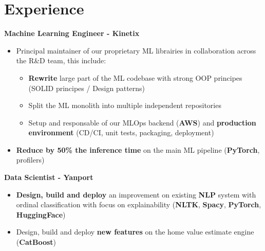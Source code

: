 \documentclass[a4paper,10pt]{article}
\begin{document}
\begin{adjustbox}{valign=t}
    \begin{minipage}{0.6\textwidth}
        \section*{Experience}
        \vspace{-.3cm}
        \begin{description}
            \raggedright
            \item[\normalfont \textcolor{ColorOne}{Since Oct. 2022}]
                \textbf{Machine Learning Engineer - Kinetix}\\
                \small
                \begin{itemize}[topsep=0pt]
                    \item Principal maintainer of our proprietary ML librairies in collaboration across the R\&D team, this include:
                    \begin{itemize}[topsep=0pt]
                        \item \textbf{Rewrite} large part of the ML codebase with strong OOP principes (SOLID principes / Design patterns)
                        \item Split the ML monolith into multiple independent repositories
                        \item Setup and responsable of our MLOps backend (\textbf{AWS}) and \textbf{production environment} (CD/CI, unit tests, packaging, deployment)
                    \end{itemize}
                    \item \textbf{Reduce by 50\% the inference time} on the main ML pipeline (\textbf{PyTorch}, profilers)
                \end{itemize}
                \normalsize
            \item[\normalfont \textcolor{ColorOne}{Sep. 2021 -- Sep. 2022}]
                \textbf{Data Scientist - Yanport}\\
                \small
                \begin{itemize}[topsep=0pt]
                    \item \textbf{Design, build and deploy} an improvement on existing \textbf{NLP} system with ordinal classification with focus on explainability (\textbf{NLTK}, \textbf{Spacy}, \textbf{PyTorch}, \textbf{HuggingFace})
                    \item Design, build and deploy \textbf{new features} on the home value estimate engine (\textbf{CatBoost})

\end{itemize}
\end{description}
\end{minipage}
\end{adjustbox}
\end{document}
